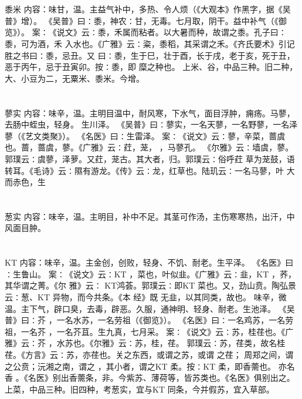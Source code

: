 \documentclass[12pt,UTF8]{ctexbook}
\begin{document}
\section{}黍米
内容：味甘，温。主益气补中，多热、令人烦（《大观本》作黑字，据《吴普》增）。 
《吴普》曰∶黍，神农∶甘，无毒。七月取，阴干。益中补气（《御览》）。 
案∶《说文》云∶黍，禾属而粘者。以大暑而种，故谓之黍。孔子曰∶黍，可为酒，禾 
入水也。《广雅》云∶粢，黍稻，其采谓之禾。《齐氏要术》引记胜之书曰∶黍，忌丑。又 
曰∶黍，生于巳，壮于酉，长于戌，老于亥，死于丑，恶于丙午，忌于丑寅卯。按∶黍，即 
糜之种也。 
上米、谷，中品三种。旧二种，大、小豆为二，无粟米、黍米。今增。 


\section{}蓼实
内容：味辛，温。主明目温中，耐风寒，下水气，面目浮肿，痈疡。马蓼，去肠中蛭虫，轻身。 
生川泽。 
《吴普》曰∶蓼实，一名天蓼，一名野蓼，一名泽蓼（《艺文类聚》）。 
《名医》曰∶生雷泽。 
案∶《说文》云∶蓼，辛菜，蔷虞也。蔷，蔷虞，蓼。《广雅》云∶荭，茏， ，马蓼孔。 
《尔雅》云∶墙虞，蓼。郭璞云∶虞蓼，泽萝。又荭，茏古。其大者，归。郭璞云∶俗呼荭 
草为茏鼓，语转耳。《毛诗》云∶隰有游龙。《传》云∶龙，红草也。陆玑云∶一名马蓼，叶 
大而赤色，生 


\section{}葱实
内容：味辛，温。主明目，补中不足。其茎可作汤，主伤寒寒热，出汗，中风面目肿。 


\section{}KT
内容：味辛，温。主金创，创败，轻身、不饥、耐老。生平泽。 
《名医》曰∶生鲁山。 
案∶《说文》云∶KT ，菜也，叶似韭。《广雅》云∶韭，KT ，荞，其华谓之菁。《尔 
雅》云∶ 
KT鸿荟。郭璞云∶即KT 菜也。又，劲山贲。陶弘景云∶葱、KT 异物，而今共条。《本 
经》既 
无韭，以其同类，故也。 
味辛，微温。主下气，辟口臭，去毒，辟恶。久服，通神明、轻身、耐老。生池泽。 
《吴普》曰∶芥 ，一名水苏，一名劳祖（《御览》）。 
《名医》曰∶一名鸡苏，一名劳祖，一名芥 ，一名芥苴。生九真，七月采。 
案∶《说文》云∶苏，桂荏也。《广雅》云∶芥 ，水苏也。《尔雅》云∶苏，桂，荏。 
郭璞云∶苏，荏类，故名桂荏。《方言》云∶苏，亦荏也。关之东西，或谓之苏，或谓 
之荏； 
周郑之间，谓之公贲；沅湘之南，谓之 ，其小者，谓之KT 柔。按∶KT 柔，即香薷也。 
亦名香 。《名医》别出香薷条，非。今紫苏、薄荷等，皆苏类也。《名医》俱别出之。 
上菜，中品三种。旧四种，考葱实，宜与KT 同条，今并假苏，宜入草部。 
\end{document}
